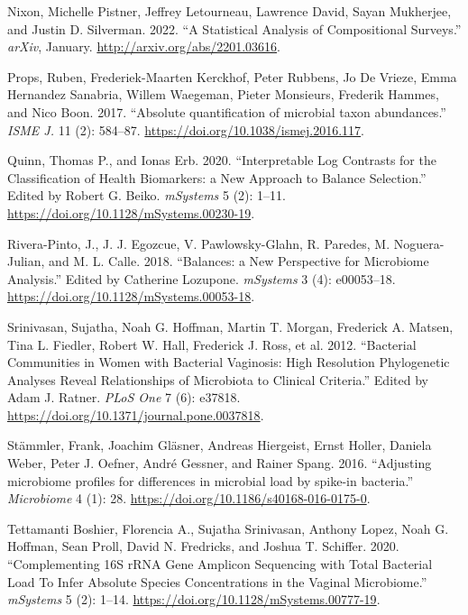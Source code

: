 \documentclass[
]{article}
\newlength{\cslhangindent}
\newlength{\cslentryspacingunit} %
\newenvironment{CSLReferences}[2] %
 {%
  \setlength{\parindent}{0pt}
  \ifodd #1
  \let\oldpar\par
  \def\par{\hangindent=\cslhangindent\oldpar}
  \fi
  \setlength{\parskip}{#2\cslentryspacingunit}
 }%
 {}
\begin{document}
\begin{CSLReferences}{1}{0}
\leavevmode{}%
Nixon, Michelle Pistner, Jeffrey Letourneau, Lawrence David, Sayan Mukherjee, and Justin D. Silverman. 2022. {``{A Statistical Analysis of Compositional Surveys}.''} \emph{arXiv}, January. \url{http://arxiv.org/abs/2201.03616}.

\leavevmode{}%
Props, Ruben, Frederiek-Maarten Kerckhof, Peter Rubbens, Jo De Vrieze, Emma Hernandez Sanabria, Willem Waegeman, Pieter Monsieurs, Frederik Hammes, and Nico Boon. 2017. {``{Absolute quantification of microbial taxon abundances}.''} \emph{ISME J.} 11 (2): 584--87. \url{https://doi.org/10.1038/ismej.2016.117}.

\leavevmode{}%
Quinn, Thomas P., and Ionas Erb. 2020. {``{Interpretable Log Contrasts for the Classification of Health Biomarkers: a New Approach to Balance Selection}.''} Edited by Robert G. Beiko. \emph{mSystems} 5 (2): 1--11. \url{https://doi.org/10.1128/mSystems.00230-19}.

\leavevmode{}%
Rivera-Pinto, J., J. J. Egozcue, V. Pawlowsky-Glahn, R. Paredes, M. Noguera-Julian, and M. L. Calle. 2018. {``{Balances: a New Perspective for Microbiome Analysis}.''} Edited by Catherine Lozupone. \emph{mSystems} 3 (4): e00053--18. \url{https://doi.org/10.1128/mSystems.00053-18}.

\leavevmode{}%
Srinivasan, Sujatha, Noah G. Hoffman, Martin T. Morgan, Frederick A. Matsen, Tina L. Fiedler, Robert W. Hall, Frederick J. Ross, et al. 2012. {``{Bacterial Communities in Women with Bacterial Vaginosis: High Resolution Phylogenetic Analyses Reveal Relationships of Microbiota to Clinical Criteria}.''} Edited by Adam J. Ratner. \emph{PLoS One} 7 (6): e37818. \url{https://doi.org/10.1371/journal.pone.0037818}.

\leavevmode{}%
Stämmler, Frank, Joachim Gläsner, Andreas Hiergeist, Ernst Holler, Daniela Weber, Peter J. Oefner, André Gessner, and Rainer Spang. 2016. {``{Adjusting microbiome profiles for differences in microbial load by spike-in bacteria}.''} \emph{Microbiome} 4 (1): 28. \url{https://doi.org/10.1186/s40168-016-0175-0}.

\leavevmode{}%
Tettamanti Boshier, Florencia A., Sujatha Srinivasan, Anthony Lopez, Noah G. Hoffman, Sean Proll, David N. Fredricks, and Joshua T. Schiffer. 2020. {``{Complementing 16S rRNA Gene Amplicon Sequencing with Total Bacterial Load To Infer Absolute Species Concentrations in the Vaginal Microbiome}.''} \emph{mSystems} 5 (2): 1--14. \url{https://doi.org/10.1128/mSystems.00777-19}.


\end{CSLReferences}
\end{document}
